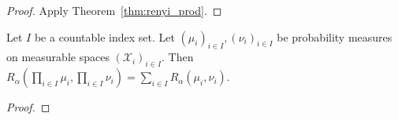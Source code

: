 \begin{proof}%
{}
Apply Theorem~\ref{thm:renyi_prod}.
\end{proof}

\begin{theorem}
  \label{thm:renyi_prod_countable}
  Let $I$ be a countable index set. Let $(\mu_i)_{i \in I}, (\nu_i)_{i \in I}$ be probability measures on measurable spaces $(\mathcal X_i)_{i \in I}$.
  Then $R_\alpha (\prod_{i \in I} \mu_i, \prod_{i \in I} \nu_i) = \sum_{i \in I} R_\alpha(\mu_i, \nu_i)$.
\end{theorem}

\begin{proof}%
{}
\end{proof}
